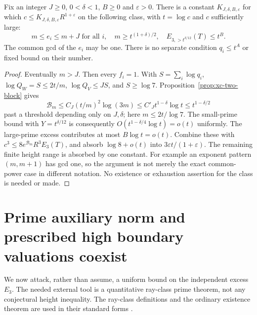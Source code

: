 \begin{theorem}
\label{thm:xc-cluster}
Fix an integer $J\ge0$, $0<\delta<1$, $B\ge0$ and $\varepsilon>0$.
There is a constant $K_{J,\delta,B,\varepsilon}$ for which
$c\le K_{J,\delta,B,\varepsilon}R^{1+\varepsilon}$ on the following class,
with $t=\log c$ and $c$ sufficiently large:
\begin{equation}\label{eq:xc-cluster-class}
 m\le e_i\le m+J\text{ for all }i,\quad
 m\ge t^{(1+\delta)/2},\quad
 E_{3,>t^{\delta/12}}(T)\le t^B.
\end{equation}
The common gcd of the $e_i$ may be one. There is no separate condition
$q_i\le t^A$ or fixed bound on their number.
\end{theorem}
\begin{proof}
Eventually $m>J$. Then every $f_i=1$. With $S=\sum_i\log q_i$,
$\log Q_W=S\le2t/m$, $\log Q_V\le JS$, and $S\ge\log7$.
Proposition~\ref{prop:xc-two-block} gives
\[
 \mathcal B_m\le C_J(t/m)^2\log(3m)
 \le C'_Jt^{1-\delta}\log t\le t^{1-\delta/2}
\]
past a threshold depending only on $J,\delta$; here $m\le2t/\log7$.
The small-prime bound with $Y=t^{\delta/12}$ is consequently
$O(t^{1-\delta/4}\log t)=o(t)$ uniformly.
The large-prime excess contributes at most $B\log t=o(t)$.
Combine these with $c^3\le8e^{\mathcal B_m}R^3E_3(T)$, and absorb
$\log8+o(t)$ into $3\varepsilon t/(1+\varepsilon)$.
The remaining finite height range is absorbed by one constant.
For example an exponent pattern $(m,m+1)$ has gcd one, so the argument
is not merely the exact common-power case in different notation.
No existence or exhaustion assertion for the class is needed or made.
\end{proof}

\section{Prime auxiliary norm and prescribed high boundary valuations coexist}
\label{sec:xc-ray}
We now attack, rather than assume, a uniform bound on the independent excess
$E_3$. The needed external tool is a quantitative ray-class prime theorem,
not any conjectural height inequality. The ray-class definitions and the
ordinary existence theorem are used in their standard forms
\cite[Chapter~V, Sections~1 and~3; Chapter~VI, Section~4]{MilneCFT}.

